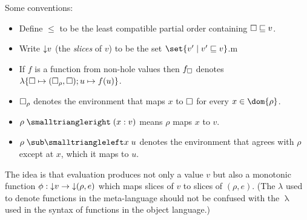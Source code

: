 

Some conventions:
\begin{itemize}
\item Define $\leq$ to be the least compatible partial order containing $\square \sqsubseteq v$.
\item Write ${\downarrow}{v}$ (the \emph{slices} of $v$) to be the set $\set{v' \mid v' \leq v}$.m
\item If $f$ is a function from non-hole values then $f_{\square}$ denotes $\lambda\{\square \mapsto (\square_\rho,\square); u \mapsto f(u)\}$.
\item $\square_\rho$ denotes the environment that maps $x$ to $\square$ for every $x \in \dom{\rho}$.
\item $\envLookup{\rho}{x}{v}$ means $\rho$ maps $x$ to $v$.
\item $\envLookupBwd{\rho}{x}{u}$ denotes the environment that agrees with $\rho$ except at $x$, which it maps to $u$.
\end{itemize}

The idea is that evaluation produces not only a value $v$ but also a monotonic function $\phi: {\downarrow}{v} \to {\downarrow}{(\rho,e)}$ which maps slices of $v$ to slices of $(\rho,e)$. (The $\lambda$ used to denote functions in the meta-language should not be confused with the $\uplambda$ used in the syntax of functions in the object language.)



